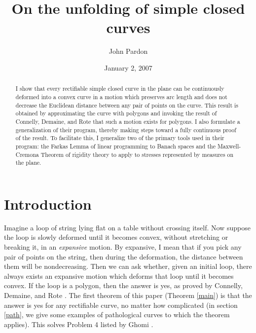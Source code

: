 \documentclass{amsart}
\numberwithin{equation}{section}
\begin{document}
\title{On the unfolding of simple closed curves}

\author{John Pardon}
\address{Durham Academy Upper School\\3601 Ridge Road\\Durham, North Carolina 27705}


\date{January 2, 2007}

\begin{abstract}
I show that every rectifiable simple closed curve in the 
plane can be continuously deformed into a convex 
curve in a motion which preserves arc length and does 
not decrease the Euclidean distance between any pair of 
points on the curve.  This result is obtained by approximating 
the curve with polygons and invoking the result of 
Connelly, Demaine, and Rote that such a motion exists 
for polygons.  I also formulate a generalization of their 
program, thereby making steps toward a fully continuous 
proof of the result.  To facilitate this, I generalize 
two of the primary tools used in their program: 
the Farkas Lemma of linear programming to Banach 
spaces and the Maxwell-Cremona Theorem of rigidity theory 
to apply to stresses represented by measures on the plane.
\end{abstract}

\maketitle

\section{Introduction}\label{intro}

Imagine a loop of string lying flat on a table without 
crossing itself.  Now suppose the loop is slowly 
deformed until it becomes convex, without stretching 
or breaking it, in an {\it expansive} motion.  
By expansive, I mean that 
if you pick any pair of points on the string, then during 
the deformation, the distance between them will be 
nondecreasing.  Then we can ask whether, given 
an initial loop, there always exists an expansive motion 
which deforms that loop until it becomes convex.  If the 
loop is a polygon, then the answer is yes, as proved by 
Connelly, Demaine, and Rote \cite{cdr}.  The first theorem 
of this paper (Theorem \ref{main}) is that the answer is yes for any rectifiable 
curve, no matter how complicated (in section \ref{path}, 
we give some examples of pathological curves to which the 
theorem applies).  This solves Problem 4 listed by Ghomi 
\cite[p. 1]{open}.
\end{document}
